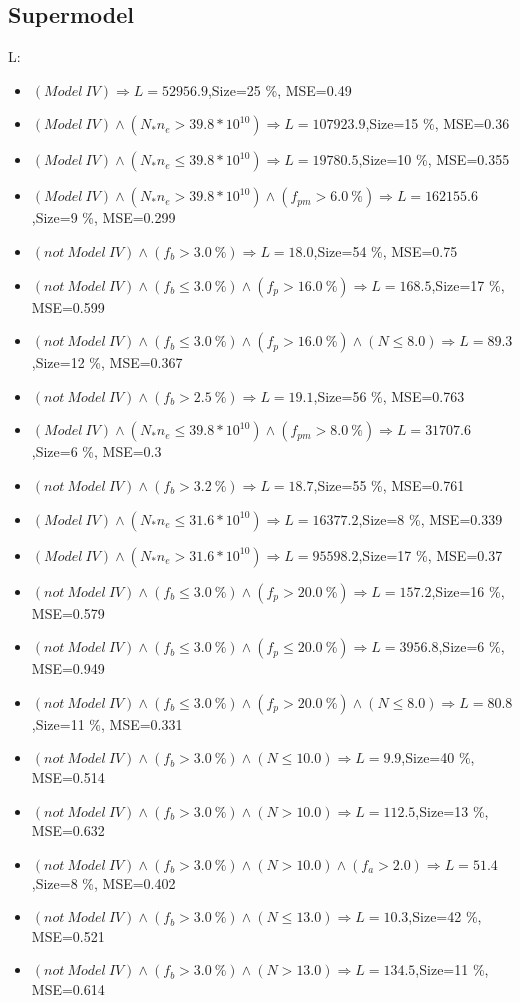 \documentclass[numbered]{CSL}
\begin{document}
\subsection{Supermodel}
L:
\begin{itemize}
\item $(Model~IV) \Rightarrow L = 52956.9$,\hfill Size=25 \%, MSE=0.49
\item $(Model~IV) \land (N_* n_e > 39.8 * 10^{10}) \Rightarrow L = 107923.9$,\hfill Size=15 \%, MSE=0.36
\item $(Model~IV) \land (N_* n_e \leq 39.8 * 10^{10}) \Rightarrow L = 19780.5$,\hfill Size=10 \%, MSE=0.355
\item $(Model~IV) \land (N_* n_e > 39.8 * 10^{10}) \land (f_{pm} > 6.0~\%) \Rightarrow L = 162155.6$,\hfill Size=9 \%, MSE=0.299
\item $(not~Model~IV) \land (f_b > 3.0~\%) \Rightarrow L = 18.0$,\hfill Size=54 \%, MSE=0.75
\item $(not~Model~IV) \land (f_b \leq 3.0~\%) \land (f_p > 16.0~\%) \Rightarrow L = 168.5$,\hfill Size=17 \%, MSE=0.599
\item $(not~Model~IV) \land (f_b \leq 3.0~\%) \land (f_p > 16.0~\%) \land (N \leq 8.0) \Rightarrow L = 89.3$,\hfill Size=12 \%, MSE=0.367
\item $(not~Model~IV) \land (f_b > 2.5~\%) \Rightarrow L = 19.1$,\hfill Size=56 \%, MSE=0.763
\item $(Model~IV) \land (N_* n_e \leq 39.8 * 10^{10}) \land (f_{pm} > 8.0~\%) \Rightarrow L = 31707.6$,\hfill Size=6 \%, MSE=0.3
\item $(not~Model~IV) \land (f_b > 3.2~\%) \Rightarrow L = 18.7$,\hfill Size=55 \%, MSE=0.761
\item $(Model~IV) \land (N_* n_e \leq 31.6 * 10^{10}) \Rightarrow L = 16377.2$,\hfill Size=8 \%, MSE=0.339
\item $(Model~IV) \land (N_* n_e > 31.6 * 10^{10}) \Rightarrow L = 95598.2$,\hfill Size=17 \%, MSE=0.37
\item $(not~Model~IV) \land (f_b \leq 3.0~\%) \land (f_p > 20.0~\%) \Rightarrow L = 157.2$,\hfill Size=16 \%, MSE=0.579
\item $(not~Model~IV) \land (f_b \leq 3.0~\%) \land (f_p \leq 20.0~\%) \Rightarrow L = 3956.8$,\hfill Size=6 \%, MSE=0.949
\item $(not~Model~IV) \land (f_b \leq 3.0~\%) \land (f_p > 20.0~\%) \land (N \leq 8.0) \Rightarrow L = 80.8$,\hfill Size=11 \%, MSE=0.331
\item $(not~Model~IV) \land (f_b > 3.0~\%) \land (N \leq 10.0) \Rightarrow L = 9.9$,\hfill Size=40 \%, MSE=0.514
\item $(not~Model~IV) \land (f_b > 3.0~\%) \land (N > 10.0) \Rightarrow L = 112.5$,\hfill Size=13 \%, MSE=0.632
\item $(not~Model~IV) \land (f_b > 3.0~\%) \land (N > 10.0) \land (f_a > 2.0) \Rightarrow L = 51.4$,\hfill Size=8 \%, MSE=0.402
\item $(not~Model~IV) \land (f_b > 3.0~\%) \land (N \leq 13.0) \Rightarrow L = 10.3$,\hfill Size=42 \%, MSE=0.521
\item $(not~Model~IV) \land (f_b > 3.0~\%) \land (N > 13.0) \Rightarrow L = 134.5$,\hfill Size=11 \%, MSE=0.614
\end{itemize}
\end{document}
